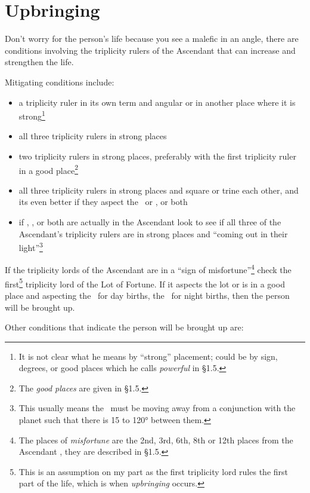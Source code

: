 \section{Upbringing}

Don't worry for the person's life because you see a malefic in an angle, there are conditions involving the triplicity rulers of the Ascendant that can increase and strengthen the life. 

Mitigating conditions include:
\begin{itemize}[topsep=0pt,itemsep=0pt]

\item a triplicity ruler in its own term and angular or in another place where it is strong\footnote{It is not clear what he means by ``strong'' placement; could be by sign, degrees, or good places which he calls \textsl{powerful} in \S1.5.}

\item all three triplicity rulers in strong places

\item two triplicity rulers in strong places, preferably with the first triplicity ruler in a good place\footnote{The \textsl{good places} are given in \S1.5.}

\item all three triplicity rulers in strong places and square or trine each other, and its even better if they aspect the \Sun\, or \Moon, or both 

\item if \Saturn, \Mars, or both are actually in the Ascendant look to see if all three of the Ascendant's triplicity rulers are in strong places and ``coming out in their light''\footnote{This usually means the \Sun\, must be moving away from a conjunction with the planet such that there is 15 to 120° between them.}
\end{itemize}

If the triplicity lords of the Ascendant are in a ``sign of misfortune''\footnote{The places of \textsl{misfortune} are the 2nd, 3rd, 6th, 8th or 12th places from the Ascendant , they are described in \S1.5.} check the first\footnote{This is an assumption on my part as the first triplicity lord rules the first part of the life, which is when \textsl{upbringing} occurs.} triplicity lord of the Lot of Fortune. If it aspects the lot or is in a good place and aspecting the \Sun\, for day births, the \Moon\, for night births, then the person will be brought up.

Other conditions that indicate the person will be brought up are:

